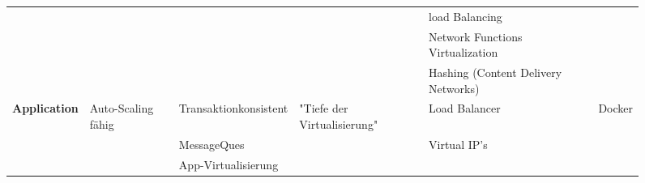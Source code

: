\documentclass[a4,12pt]{scrartcl}
\begin{document}
\begin{landscape}
\begin{figure}[htbp]
\begin{center}
\begin{adjustbox}{max width=600px}
\begin{tabular}{@{} l l l l l r@{}}
	& & & & load Balancing & \\ \addlinespace
	& & & & Network Functions Virtualization & \\ \addlinespace
	& & & & Hashing (Content Delivery Networks) & \\ \addlinespace
	\textbf{Application} & Auto-Scaling fähig & Transaktionkonsistent & "Tiefe der Virtualisierung" & Load Balancer & Docker \\ \addlinespace
	& & MessageQues & & Virtual IP's & \\ \addlinespace
	& & App-Virtualisierung & & & \\
    \bottomrule
    \end{tabular}
    \end{adjustbox}
\end{center}

\end{figure}
\end{landscape}
\end{document}
